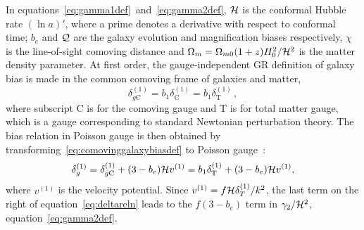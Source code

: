 In equations~\eqref{eq:gamma1def}~and~\eqref{eq:gamma2def}, \(\mathcal{H}\) is the conformal Hubble rate \((\ln a)'\), where a prime denotes a derivative with respect to conformal time; \(b_e\) and \(\mathcal{Q}\) are the galaxy evolution and magnification biases respectively, \(\chi\) is the line-of-sight comoving distance and \(\Omega_m = \Omega_{m0} (1+z) H_0^2/\mathcal{H}^2\) is the matter density parameter. At first order, the gauge-independent GR definition of galaxy bias is made in the common comoving frame of galaxies and matter, 
\begin{equation}\label{eq:comovinggalaxybiasdef}
	\delta_{g\mathrm{C}}^{(1)} = b_1 \delta_\mathrm{C}^{(1)} =  b_1 \delta_\mathrm{T}^{(1)}\,,
\end{equation}
where subscript C is for the comoving gauge and T is for total matter gauge, which is a gauge corresponding to standard Newtonian perturbation theory. The bias relation in Poisson gauge is then obtained by transforming~\eqref{eq:comovinggalaxybiasdef} to Poisson gauge~\cite{Bertacca:2014wga,Jolicoeur:2017eyi}:
\begin{equation}\label{eq:deltareln}
	\delta_g^{(1)} = \delta_{g\mathrm{C}}^{(1)} + (3 - b_e)\mathcal{H} v^{(1)} = b_1 \delta_\mathrm{T}^{(1)} + (3-b_e)\mathcal{H} v^{(1)},
\end{equation}
where \(v^{(1)}\) is the velocity potential. Since \(v^{(1)} =f \mathcal{H} \delta_T^{(1)}/k^2\), the last term on the right of equation~\eqref{eq:deltareln} leads to the \(f(3-b_e)\) term in \(\gamma_2/\mathcal{H}^2\), equation~\eqref{eq:gamma2def}.


